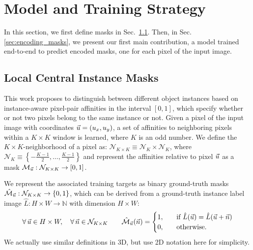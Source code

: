 
\section{Model and Training Strategy}\label{sec:model}
In this section, we first define \maskname masks in Sec.~\ref{sec:self_masks}.
Then, in Sec. \ref{sec:encoding_masks}, we present our first main contribution, a model trained end-to-end to predict encoded \maskname masks, one for each pixel of the input image. 

\subsection{Local Central Instance Masks}\label{sec:self_masks}
This work proposes to distinguish between different object instances based on instance-aware pixel-pair affinities in the interval $[0,1]$, which specify whether or not two pixels belong to the same instance or not.
Given a pixel of the input image with coordinates $\vec{u}= (u_x, u_y)$, a set of affinities to neighboring pixels within a $K\times K$ window is learned, where $K$ is an odd number. 
We define the $K\times K$-neighborhood of a pixel as: 
$\mathcal{N}_{K\times K} \equiv \mathcal{N}_{K} \times \mathcal{N}_{K}$, where $\mathcal{N}_{K} \equiv \left\{-\frac{K-1}{2}, \ldots, \frac{K-1}{2}\right\}$ and represent the affinities relative to pixel $\vec{u}$ as a \maskname mask $\mathcal{M}_{\vec{u}}: \mathcal{N}_{K\times K} \rightarrow [0,1]$.

We represent the associated training targets as binary ground-truth masks $\hat{\mathcal{M}}_{\vec{u}}: \mathcal{N}_{K\times K} \rightarrow \{0,1\}$, which can be derived from a ground-truth instance label image $\hat{L}: H\times W \rightarrow \mathbb{N}$ with dimension $H\times W$:
\begin{equation}\label{eq:target_masks}
\forall\, \vec{u}\in H\times W, \quad \forall\, \vec{n}\in \mathcal{N}_{K\times K} \qquad \hat{\mathcal{M}}_{\vec{u}}(\vec{n}) = 
\begin{cases}
1, \quad &\text{if } \hat{L}(\vec{u}) = \hat{L}(\vec{u}+\vec{n}) \\
0, \quad & \text{otherwise}.
\end{cases}
\end{equation}
We actually use similar definitions in 3D, but use 2D notation here for simplicity.


